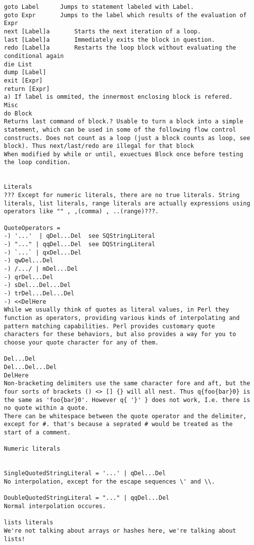 \documentclass{article}
\begin{document}
\begin{description}
{\begin{verbatim}
goto Label		Jumps to statement labeled with Label.
goto Expr		Jumps to the label which results of the evaluation of Expr		
next [Label]a		Starts the next iteration of a loop.  
last [Label]a		Immediately exits the block in question. 
redo [Label]a		Restarts the loop block without evaluating the conditional again
die List
dump [Label]
exit [Expr]
return [Expr]
a) If label is ommited, the innermost enclosing block is refered. 
Misc
do Block
Returns last command of block.? Usable to turn a block into a simple statement, which can be used in some of the following flow control constructs. Does not count as a loop (just a block counts as loop, see block). Thus next/last/redo are illegal for that block
When modified by while or until, exuectues Block once before testing the loop condition.


Literals
??? Except for numeric literals, there are no true literals. String literals, list literals, range literals are actually expressions using operators like "" , ,(comma) , ..(range)???.

QuoteOperators = 
-) '...'  | qDel...Del	see SQStringLiteral
-) "..." | qqDel...Del	see DQStringLiteral
-) `...` | qxDel...Del
-) qwDel...Del
-) /.../ | mDel...Del
-) qrDel...Del
-) sDel...Del...Del
-) trDel...Del...Del
-) <<DelHere
While we usually think of quotes as literal values, in Perl they function as operators, providing various kinds of interpolating and pattern matching capabilities. Perl provides customary quote characters for these behaviors, but also provides a way for you to choose your quote character for any of them. 

Del...Del
Del...Del...Del
DelHere
Non-bracketing delimiters use the same character fore and aft, but the four sorts of brackets () <> [] {} will all nest. Thus q{foo{bar}0} is the same as 'foo{bar}0'. However q{ '}' } does not work, I.e. there is no quote within a quote.
There can be whitespace between the quote operator and the delimiter, except for #. that's because a seprated # would be treated as the start of a comment.

Numeric literals


SingleQuotedStringLiteral = '...' | qDel...Del      
No interpolation, except for the escape sequences \' and \\. 

DoubleQuotedStringLiteral = "..." | qqDel...Del
Normal interpolation occures.

lists literals
We're not talking about arrays or hashes here, we're talking about lists!


\end{verbatim}}
\end{description}
\end{document}
